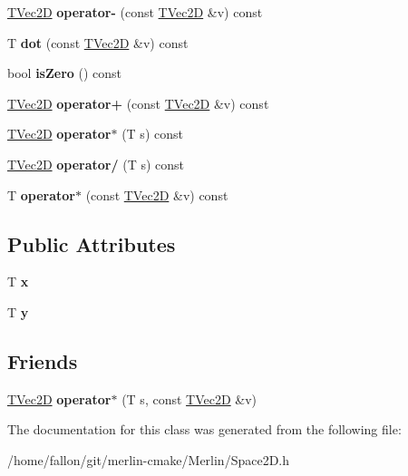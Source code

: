 \begin{DoxyCompactItemize}
\item 
\mbox{\label{classTVec2D_aef5df6abb3c6921c0c600e0050bc28c9}} 
\hyperlink{classTVec2D}{T\+Vec2D} {\bfseries operator-\/} (const \hyperlink{classTVec2D}{T\+Vec2D} \&v) const
\item 
\mbox{\label{classTVec2D_abc342578fcac2baf46004c7a3e5e2cd9}} 
T {\bfseries dot} (const \hyperlink{classTVec2D}{T\+Vec2D} \&v) const
\item 
\mbox{\label{classTVec2D_aa9907ea8410af252967067224ab66685}} 
bool {\bfseries is\+Zero} () const
\item 
\mbox{\label{classTVec2D_a3658fadf42bd6469a561f81dd2bdd4e8}} 
\hyperlink{classTVec2D}{T\+Vec2D} {\bfseries operator+} (const \hyperlink{classTVec2D}{T\+Vec2D} \&v) const
\item 
\mbox{\label{classTVec2D_ab1a4960810e8cd982ac674b61b1ceb7f}} 
\hyperlink{classTVec2D}{T\+Vec2D} {\bfseries operator$\ast$} (T s) const
\item 
\mbox{\label{classTVec2D_a07771f67b8c8522437ff452c5a354bf4}} 
\hyperlink{classTVec2D}{T\+Vec2D} {\bfseries operator/} (T s) const
\item 
\mbox{\label{classTVec2D_ad8b2de38fa223e2fd94f6096b628707a}} 
T {\bfseries operator$\ast$} (const \hyperlink{classTVec2D}{T\+Vec2D} \&v) const
\end{DoxyCompactItemize}
\subsection*{Public Attributes}
\begin{DoxyCompactItemize}
\item 
\mbox{\label{classTVec2D_a18b0cb40ff56af33bfb29c1322b17a69}} 
T {\bfseries x}
\item 
\mbox{\label{classTVec2D_a24ef324c60f4083f0923fd7b018ac335}} 
T {\bfseries y}
\end{DoxyCompactItemize}
\subsection*{Friends}
\begin{DoxyCompactItemize}
\item 
\mbox{\label{classTVec2D_a3d70af7c80e6c3fa14922d8885ac8381}} 
\hyperlink{classTVec2D}{T\+Vec2D} {\bfseries operator$\ast$} (T s, const \hyperlink{classTVec2D}{T\+Vec2D} \&v)
\end{DoxyCompactItemize}


The documentation for this class was generated from the following file\+:\begin{DoxyCompactItemize}
\item 
/home/fallon/git/merlin-\/cmake/\+Merlin/Space2\+D.\+h\end{DoxyCompactItemize}
